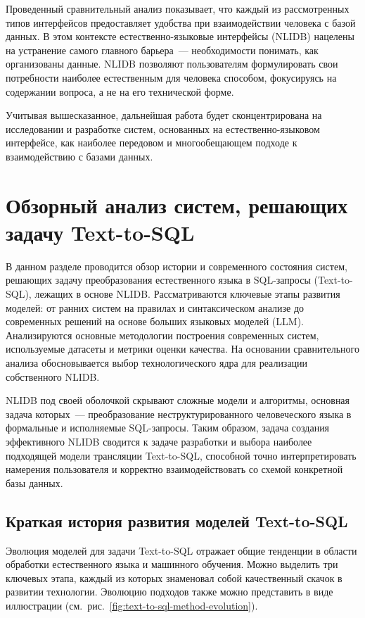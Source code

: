 Проведенный сравнительный анализ показывает, что каждый из рассмотренных типов интерфейсов предоставляет
удобства при взаимодействии человека с базой данных.
В этом контексте естественно-языковые интерфейсы (NLIDB) нацелены на устранение самого главного барьера~--- необходимости понимать,
как организованы данные. NLIDB позволяют пользователям формулировать свои потребности наиболее
естественным для человека способом, фокусируясь на содержании вопроса, а не на его технической форме.

Учитывая вышесказанное, дальнейшая работа будет сконцентрирована на исследовании и разработке систем,
основанных на естественно-языковом интерфейсе, как наиболее передовом и многообещающем подходе
к взаимодействию с базами данных.




\section{Обзорный анализ систем, решающих задачу Text-to-SQL}
\begin{annotation}
	В данном разделе проводится обзор истории и современного состояния систем,
	решающих задачу преобразования естественного языка в SQL-запросы (Text-to-SQL),
	лежащих в основе NLIDB. Рассматриваются ключевые этапы развития моделей:
	от ранних систем на правилах и синтаксическом анализе до современных решений на основе
	больших языковых моделей (LLM). Анализируются основные методологии построения современных систем,
	используемые датасеты и метрики оценки качества. На основании сравнительного анализа
	обосновывается выбор технологического ядра для реализации собственного NLIDB.
\end{annotation}

NLIDB под своей оболочкой скрывают сложные модели и алгоритмы, основная задача которых~--- преобразование
неструктурированного человеческого языка в формальные и исполняемые SQL-запросы. Таким образом, задача
создания эффективного NLIDB сводится к задаче разработки и выбора наиболее подходящей модели трансляции Text-to-SQL,
способной точно интерпретировать намерения пользователя и корректно взаимодействовать со схемой конкретной базы данных.

\subsection{Краткая история развития моделей Text-to-SQL}

Эволюция моделей для задачи Text-to-SQL отражает общие тенденции в области обработки естественного языка и
машинного обучения. Можно выделить три ключевых этапа, каждый из которых знаменовал собой качественный
скачок в развитии технологии. Эволюцию подходов также можно представить в виде иллюстрации
(см.~рис.~\ref{fig:text-to-sql-method-evolution}).

